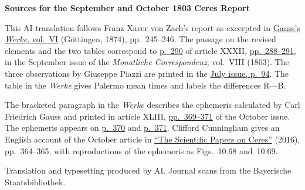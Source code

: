 \clearpage\thispagestyle{empty}
\begin{center}\textbf{Sources for the September and October 1803 Ceres Report}\end{center}
\noindent This AI translation follows Franz Xaver von Zach’s report as excerpted in \href{https://gdz.sub.uni-goettingen.de/id/PPN236007467}{Gauss’s \textit{Werke}, vol.~VI} (Göttingen, 1874), pp.~245--246. The passage on the revised elements and the two tables correspond to \href{https://api.digitale-sammlungen.de/iiif/image/v2/bsb10538600_00298/full/1450,/0/default.jpg}{p.~290} of article XXXII, \href{https://api.digitale-sammlungen.de/iiif/image/v2/bsb10538600_00296/full/1450,/0/default.jpg}{pp.~288--291}, in the September issue of the \textit{Monatliche Correspondenz}, vol.~VIII (1803). The three observations by Giuseppe Piazzi are printed in the \href{https://api.digitale-sammlungen.de/iiif/image/v2/bsb10538600_00100/full/1450,/0/default.jpg}{July issue, p.~94}. The table in the \textit{Werke} gives Palermo mean times and labels the differences R—B.
\par\smallskip\noindent The bracketed paragraph in the \textit{Werke} describes the ephemeris calculated by Carl Friedrich Gauss and printed in article XLIII, \href{https://api.digitale-sammlungen.de/iiif/image/v2/bsb10538600_00379/full/1450,/0/default.jpg}{pp.~369--371} of the October issue. The ephemeris appears on \href{https://api.digitale-sammlungen.de/iiif/image/v2/bsb10538600_00380/full/1450,/0/default.jpg}{p.~370} and \href{https://api.digitale-sammlungen.de/iiif/image/v2/bsb10538600_00381/full/1450,/0/default.jpg}{p.~371}. Clifford Cunningham gives an English account of the October article in \href{https://doi.org/10.1007/978-3-319-28815-4_10}{“The Scientific Papers on Ceres”} (2016), pp.~364--365, with reproductions of the ephemeris as Figs.~10.68 and~10.69.
\par\smallskip\noindent Translation and typesetting produced by AI. Journal scans from the Bayerische Staatsbibliothek.
\clearpage
